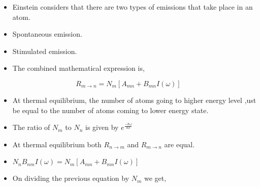 \documentclass[aspectratio=169]{beamer}
\begin{document}
\begin{frame}{}

	\begin{itemize}

		\item Einstein considers that there are two types of emissions that take place in an atom. \newline
		\item Spontaneous emission. \newline
		\item Stimulated emission.
		
	\end{itemize}
	
\end{frame}

\begin{frame}{}

	\begin{itemize}
	
		\item The combined mathematical expression is,
		
	\end{itemize}
	
			\begin{equation}
					 R_{m \to n} = N_{m} [A_{mn} + B_{mn} I(\omega)] 
			\end{equation} 
	
\end{frame}

\begin{frame}{}

	\begin{itemize}

		\item At thermal equilibrium, the number of atoms going to higher energy level ,ust be equal to the number of atoms coming to 					  lower energy state. \newline	
		\item The ratio of $ N_{m} $ to $ N_{n} $ is given by $ e^{\frac{-\hbar \omega}{kT}} $  \newline
 
	\end{itemize}
	
\end{frame}

\begin{frame}{}

	\begin{itemize}

		\item At thermal equilibrium both $ R_{n \to m} $ and $ R_{m \to n} $ are equal.  \newline
		\item $ N_{n} B_{nm} I(\omega) = N_{m} [A_{mn} + B_{mn} I(\omega)] $ \newline
		\item On dividing the previous equation by $ N_{m} $ we get, 
		
	\end{itemize}
	
\end{frame}
\end{document}
